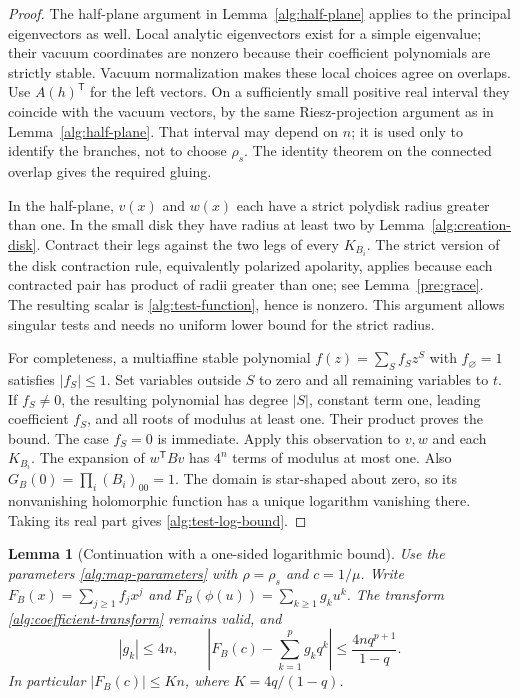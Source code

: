 \documentclass[reqno]{amsart}
\newtheorem{lemma}[theorem]{Lemma}
\theoremstyle{definition}
\theoremstyle{remark}
\begin{document}
\begin{proof}
The half-plane argument in Lemma~\ref{alg:half-plane} applies to
the principal eigenvectors as well.  Local analytic eigenvectors
exist for a simple eigenvalue; their vacuum coordinates are nonzero
because their coefficient polynomials are strictly stable.
Vacuum normalization makes these local choices agree on overlaps.
Use \(A(h)^{\mathsf T}\) for the left vectors.
On a sufficiently small positive real interval they coincide
with the vacuum vectors, by the same Riesz-projection argument
as in Lemma~\ref{alg:half-plane}.  That interval may depend on \(n\);
it is used only to identify the branches, not to choose
\(\rho_s\).  The identity theorem on the connected overlap
gives the required gluing.

In the half-plane, \(v(x)\) and \(w(x)\) each have a strict
polydisk radius greater than one.  In the small disk they have
radius at least two by Lemma~\ref{alg:creation-disk}.
Contract their legs against the two legs of every \(K_{B_i}\).
The strict version of the disk contraction rule, equivalently
polarized apolarity, applies because each contracted pair has
product of radii greater than one; see
Lemma~\ref{pre:grace}.
The resulting scalar is \eqref{alg:test-function}, hence is
nonzero.  This argument allows singular tests and needs no
uniform lower bound for the strict radius.

For completeness, a multiaffine stable polynomial
\(f(z)=\sum_S f_Sz^S\) with \(f_\varnothing=1\) satisfies
\(|f_S|\le1\).  Set variables outside \(S\) to zero and all
remaining variables to \(t\).  If \(f_S\ne0\), the resulting
polynomial has degree \(|S|\), constant term one, leading
coefficient \(f_S\), and all roots of modulus at least one.
Their product proves the bound.  The case \(f_S=0\) is immediate.
Apply this observation to \(v,w\) and each \(K_{B_i}\).
The expansion of \(w^{\mathsf T}Bv\) has \(4^n\) terms of modulus
at most one.  Also \(G_B(0)=\prod_i(B_i)_{00}=1\).
The domain is star-shaped about zero, so its nonvanishing
holomorphic function has a unique logarithm vanishing there.
Taking its real part gives \eqref{alg:test-log-bound}.
\end{proof}

\begin{lemma}[Continuation with a one-sided logarithmic bound]
\label{alg:log-continuation}
Use the parameters \eqref{alg:map-parameters} with
\(\rho=\rho_s\) and \(c=1/\mu\).  Write
\(F_B(x)=\sum_{j\ge1} f_jx^j\) and
\(F_B(\phi(u))=\sum_{k\ge1}g_ku^k\).
The transform \eqref{alg:coefficient-transform} remains valid,
and
\begin{equation}\label{alg:log-tail}
 |g_k|\le4n,\qquad
 \left|F_B(c)-\sum_{k=1}^p g_kq^k\right|
       \le \frac{4nq^{p+1}}{1-q}.
\end{equation}
In particular \(|F_B(c)|\le Kn\), where \(K=4q/(1-q)\).
\end{lemma}
\end{document}
